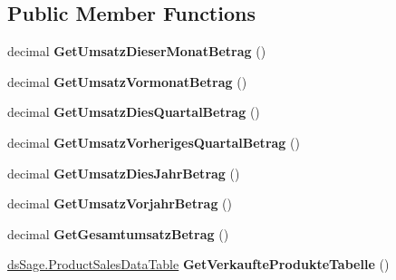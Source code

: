 \subsection*{Public Member Functions}
\begin{DoxyCompactItemize}
\item 
decimal {\bfseries Get\+Umsatz\+Dieser\+Monat\+Betrag} ()\hypertarget{class_products_1_1_model_1_1_entities_1_1_kunde_abad8962a33895fc3b3b7d4bd8a671d97}{}\label{class_products_1_1_model_1_1_entities_1_1_kunde_abad8962a33895fc3b3b7d4bd8a671d97}

\item 
decimal {\bfseries Get\+Umsatz\+Vormonat\+Betrag} ()\hypertarget{class_products_1_1_model_1_1_entities_1_1_kunde_a04b2baa4c72794cee9657f6b8644d07c}{}\label{class_products_1_1_model_1_1_entities_1_1_kunde_a04b2baa4c72794cee9657f6b8644d07c}

\item 
decimal {\bfseries Get\+Umsatz\+Dies\+Quartal\+Betrag} ()\hypertarget{class_products_1_1_model_1_1_entities_1_1_kunde_afe3c9b3c9843a1dcddb8942de6d39c27}{}\label{class_products_1_1_model_1_1_entities_1_1_kunde_afe3c9b3c9843a1dcddb8942de6d39c27}

\item 
decimal {\bfseries Get\+Umsatz\+Vorheriges\+Quartal\+Betrag} ()\hypertarget{class_products_1_1_model_1_1_entities_1_1_kunde_a7661765e88f0e1669af8fe8b4b9762fa}{}\label{class_products_1_1_model_1_1_entities_1_1_kunde_a7661765e88f0e1669af8fe8b4b9762fa}

\item 
decimal {\bfseries Get\+Umsatz\+Dies\+Jahr\+Betrag} ()\hypertarget{class_products_1_1_model_1_1_entities_1_1_kunde_a4f4560035a68712bfaf31d86cac442e9}{}\label{class_products_1_1_model_1_1_entities_1_1_kunde_a4f4560035a68712bfaf31d86cac442e9}

\item 
decimal {\bfseries Get\+Umsatz\+Vorjahr\+Betrag} ()\hypertarget{class_products_1_1_model_1_1_entities_1_1_kunde_a3b4a6bd28e5e8b9f3a5a8369b36c15d7}{}\label{class_products_1_1_model_1_1_entities_1_1_kunde_a3b4a6bd28e5e8b9f3a5a8369b36c15d7}

\item 
decimal {\bfseries Get\+Gesamtumsatz\+Betrag} ()\hypertarget{class_products_1_1_model_1_1_entities_1_1_kunde_aadd181c6b61872bfa594936d1e9a3b6f}{}\label{class_products_1_1_model_1_1_entities_1_1_kunde_aadd181c6b61872bfa594936d1e9a3b6f}

\item 
\hyperlink{class_products_1_1_data_1_1ds_sage_1_1_product_sales_data_table}{ds\+Sage.\+Product\+Sales\+Data\+Table} {\bfseries Get\+Verkaufte\+Produkte\+Tabelle} ()\hypertarget{class_products_1_1_model_1_1_entities_1_1_kunde_a62337869ad29e010801f9fc91f4744cb}{}\label{class_products_1_1_model_1_1_entities_1_1_kunde_a62337869ad29e010801f9fc91f4744cb}


\end{DoxyCompactItemize}
